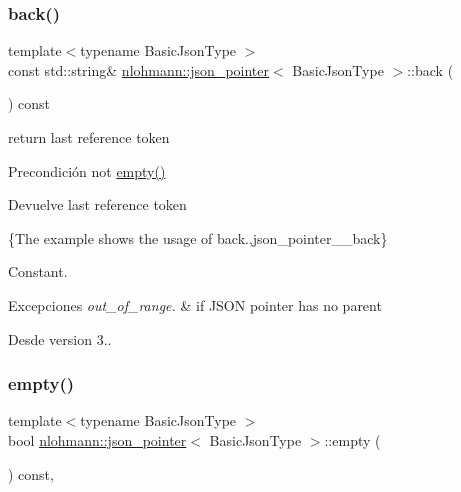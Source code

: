 \subsubsection{\texorpdfstring{back()}{back()}}
{\footnotesize\ttfamily template$<$typename Basic\+Json\+Type $>$ \\
const std\+::string\& \mbox{\hyperlink{classnlohmann_1_1json__pointer}{nlohmann\+::json\+\_\+pointer}}$<$ Basic\+Json\+Type $>$\+::back (\begin{DoxyParamCaption}{ }\end{DoxyParamCaption}) const\hspace{0.3cm}{\ttfamily [inline]}}



return last reference token 

\begin{DoxyPrecond}{Precondición}
not {\ttfamily \mbox{\hyperlink{classnlohmann_1_1json__pointer_a649252bda4a2e75a0915b11a25d8bcc3}{empty()}}} 
\end{DoxyPrecond}
\begin{DoxyReturn}{Devuelve}
last reference token
\end{DoxyReturn}
\{The example shows the usage of {\ttfamily back}.,json\+\_\+pointer\+\_\+\+\_\+back\}

Constant.


\begin{DoxyExceptions}{Excepciones}
{\em out\+\_\+of\+\_\+range.} & if J\+S\+ON pointer has no parent\\
\hline
\end{DoxyExceptions}
\begin{DoxySince}{Desde}
version 3.. 
\end{DoxySince}
\mbox{\label{classnlohmann_1_1json__pointer_a649252bda4a2e75a0915b11a25d8bcc3}} 
\subsubsection{\texorpdfstring{empty()}{empty()}}
{\footnotesize\ttfamily template$<$typename Basic\+Json\+Type $>$ \\
bool \mbox{\hyperlink{classnlohmann_1_1json__pointer}{nlohmann\+::json\+\_\+pointer}}$<$ Basic\+Json\+Type $>$\+::empty (\begin{DoxyParamCaption}{ }\end{DoxyParamCaption}) const\hspace{0.3cm}{\ttfamily [inline]}, {\ttfamily [noexcept]}}



